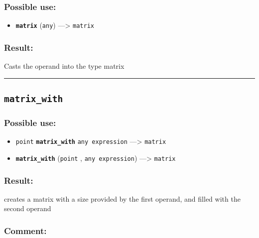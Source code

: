\documentclass[]{book}
\providecommand{\tightlist}{%
  \setlength{\itemsep}{0pt}\setlength{\parskip}{0pt}}
\theoremstyle{definition}
\theoremstyle{definition}
\theoremstyle{definition}
\theoremstyle{remark}
\begin{document}
\subsubsection{Possible use:}\label{possible-use-337}

\begin{itemize}
\tightlist
\item
  \textbf{\texttt{matrix}} (\texttt{any}) ---\textgreater{}
  \texttt{matrix}
\end{itemize}

\subsubsection{Result:}\label{result-326}

Casts the operand into the type matrix

\begin{center}\rule{0.5\linewidth}{\linethickness}\end{center}

\subsection{\texorpdfstring{\texttt{matrix\_with}}{matrix\_with}}\label{matrix_with}

\subsubsection{Possible use:}\label{possible-use-338}

\begin{itemize}
\tightlist
\item
  \texttt{point} \textbf{\texttt{matrix\_with}} \texttt{any\ expression}
  ---\textgreater{} \texttt{matrix}
\item
  \textbf{\texttt{matrix\_with}} (\texttt{point} ,
  \texttt{any\ expression}) ---\textgreater{} \texttt{matrix}
\end{itemize}

\subsubsection{Result:}\label{result-327}

creates a matrix with a size provided by the first operand, and filled
with the second operand

\subsubsection{Comment:}\label{comment-64}
\end{document}
